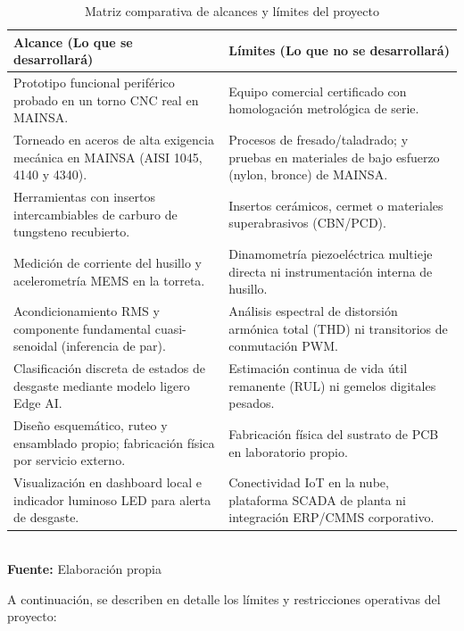 {\setlength{\parskip}{1.5pt}
\begin{table}[htbp]
\centering
\caption{Matriz comparativa de alcances y límites del proyecto}
\label{tab:alcance_limites}
\begin{tabular}{L{6.8cm}L{7.2cm}}
\hline
\textbf{Alcance (Lo que se desarrollará)} & \textbf{Límites (Lo que no se desarrollará)} \\ \hline \hline
Prototipo funcional periférico probado en un torno CNC real en MAINSA. & Equipo comercial certificado con homologación metrológica de serie. \\ \hline
Torneado en aceros de alta exigencia mecánica en MAINSA (AISI 1045, 4140 y 4340). & Procesos de fresado/taladrado; y pruebas en materiales de bajo esfuerzo (nylon, bronce) de MAINSA. \\ \hline
Herramientas con insertos intercambiables de carburo de tungsteno recubierto. & Insertos cerámicos, cermet o materiales superabrasivos (CBN/PCD). \\ \hline
Medición de corriente del husillo y acelerometría MEMS en la torreta. & Dinamometría piezoeléctrica multieje directa ni instrumentación interna de husillo. \\ \hline
Acondicionamiento RMS y componente fundamental cuasi-senoidal (inferencia de par). & Análisis espectral de distorsión armónica total (THD) ni transitorios de conmutación PWM. \\ \hline
Clasificación discreta de estados de desgaste mediante modelo ligero Edge AI. & Estimación continua de vida útil remanente (RUL) ni gemelos digitales pesados. \\ \hline
Diseño esquemático, ruteo y ensamblado propio; fabricación física por servicio externo. & Fabricación física del sustrato de PCB en laboratorio propio. \\ \hline
Visualización en dashboard local e indicador luminoso LED para alerta de desgaste. & Conectividad IoT en la nube, plataforma SCADA de planta ni integración ERP/CMMS corporativo. \\ \hline
\end{tabular}
\\[2pt]
{\footnotesize \textbf{Fuente:} Elaboración propia}
\end{table}
}

A continuación, se describen en detalle los límites y restricciones operativas del proyecto:

